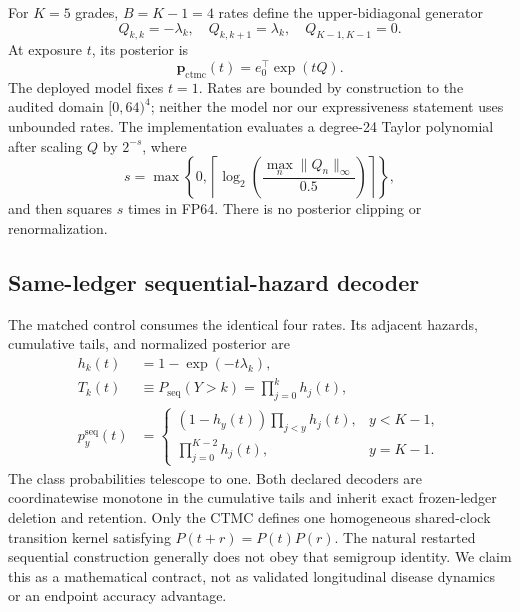 \documentclass[10pt,twocolumn,letterpaper]{article}
\begin{document}
For $K=5$ grades, $B=K-1=4$ rates define the upper-bidiagonal generator
\begin{equation}
 Q_{k,k}=-\lambda_k,\quad Q_{k,k+1}=\lambda_k,
 \quad Q_{K-1,K-1}=0.
 \label{eq:supp-generator}
\end{equation}
At exposure $t$, its posterior is
\begin{equation}
 \mathbf p_{\mathrm{ctmc}}(t)=e_0^\top\exp(tQ).
 \label{eq:supp-ctmc}
\end{equation}
The deployed model fixes $t=1$.  Rates are bounded by construction to the
audited domain $[0,64)^4$; neither the model nor our expressiveness statement
uses unbounded rates.  The implementation evaluates a degree-24 Taylor
polynomial after scaling $Q$ by $2^{-s}$, where
\begin{equation}
 s=\max\!\left\{0,\left\lceil
 \log_2\!\left(\frac{\max_n\lVert Q_n\rVert_\infty}{0.5}\right)
 \right\rceil\right\},
 \label{eq:supp-scaling}
\end{equation}
and then squares $s$ times in FP64.  There is no posterior clipping or
renormalization.

\subsection{Same-ledger sequential-hazard decoder}

The matched control consumes the identical four rates.  Its adjacent hazards,
cumulative tails, and normalized posterior are
\begin{align}
 h_k(t)&=1-\exp(-t\lambda_k),\\
 T_k(t)&\equiv P_{\mathrm{seq}}(Y>k)
 =\prod_{j=0}^{k}h_j(t),
 \label{eq:supp-hazards}\\
 p^{\mathrm{seq}}_y(t)&=
 \begin{cases}
 (1-h_y(t))\prod_{j<y}h_j(t),&y<K-1,\\
 \prod_{j=0}^{K-2}h_j(t),&y=K-1.
 \end{cases}
 \label{eq:supp-sequential}
\end{align}
The class probabilities telescope to one.  Both declared decoders are
coordinatewise monotone in the cumulative tails and inherit exact frozen-ledger
deletion and retention.  Only the CTMC defines one homogeneous shared-clock
transition kernel satisfying
$P(t+r)=P(t)P(r)$.  The natural restarted sequential construction generally
does not obey that semigroup identity.  We claim this as a mathematical
contract, not as validated longitudinal disease dynamics or an endpoint
accuracy advantage.
\end{document}
